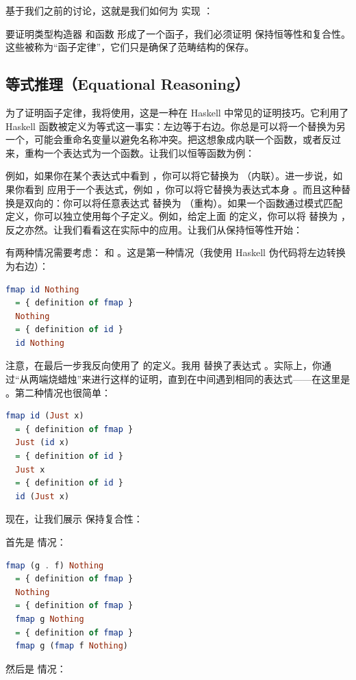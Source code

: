 基于我们之前的讨论，这就是我们如何为  实现 ：

要证明类型构造器  和函数  形成了一个函子，我们必须证明  保持恒等性和复合性。这些被称为“函子定律”，它们只是确保了范畴结构的保存。

\subsection{等式推理（Equational Reasoning）}

为了证明函子定律，我将使用，这是一种在 Haskell 中常见的证明技巧。它利用了 Haskell 函数被定义为等式这一事实：左边等于右边。你总是可以将一个替换为另一个，可能会重命名变量以避免名称冲突。把这想象成内联一个函数，或者反过来，重构一个表达式为一个函数。让我们以恒等函数为例：

例如，如果你在某个表达式中看到 ，你可以将它替换为 （内联）。进一步说，如果你看到  应用于一个表达式，例如 ，你可以将它替换为表达式本身 。而且这种替换是双向的：你可以将任意表达式  替换为 （重构）。如果一个函数通过模式匹配定义，你可以独立使用每个子定义。例如，给定上面  的定义，你可以将  替换为 ，反之亦然。让我们看看这在实际中的应用。让我们从保持恒等性开始：

有两种情况需要考虑： 和 。这是第一种情况（我使用 Haskell 伪代码将左边转换为右边）：

\begin{lstlisting}[language=Haskell]
  fmap id Nothing
  = { definition of fmap }
  Nothing
  = { definition of id }
  id Nothing
\end{lstlisting}
注意，在最后一步我反向使用了  的定义。我用  替换了表达式 。实际上，你通过“从两端烧蜡烛”来进行这样的证明，直到在中间遇到相同的表达式——在这里是 。第二种情况也很简单：

\begin{lstlisting}[language=Haskell]
  fmap id (Just x)
  = { definition of fmap }
  Just (id x)
  = { definition of id }
  Just x
  = { definition of id }
  id (Just x)
\end{lstlisting}
现在，让我们展示  保持复合性：

首先是  情况：

\begin{lstlisting}[language=Haskell]
  fmap (g . f) Nothing
  = { definition of fmap }
  Nothing
  = { definition of fmap }
  fmap g Nothing
  = { definition of fmap }
  fmap g (fmap f Nothing)
\end{lstlisting}
然后是  情况：

